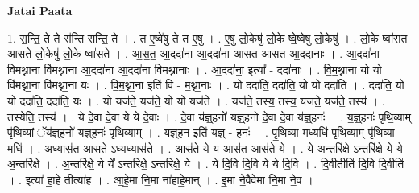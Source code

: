 \documentclass[17pt]{extarticle}
\begin{document}
\textbf{Jatai Paata} \newline

1. स॒न्ति॒ ते ते स॑न्ति सन्ति॒ ते । . त ए॒ष्वे॑षु ते त ए॒षु । . ए॒षु लो॒केषु॑ लो॒के ष्वे॒ष्वे॑षु लो॒केषु॑ । . लो॒के ष्वा॑सत आसते लो॒केषु॑ लो॒के ष्वा॑सते । . आ॒स॒त॒ आ॒ददा॑ना आ॒ददा॑ना आसत आसत आ॒ददा॑नाः । . आ॒ददा॑ना विमथ्ना॒ना वि॑मथ्ना॒ना आ॒ददा॑ना आ॒ददा॑ना विमथ्ना॒नाः । . आ॒ददा॑ना॒ इत्या᳚ - ददा॑नाः । . वि॒म॒थ्ना॒ना यो यो वि॑मथ्ना॒ना वि॑मथ्ना॒ना यः । . वि॒म॒थ्ना॒ना इति॑ वि - म॒थ्ना॒नाः । . यो ददा॑ति॒ ददा॑ति॒ यो यो ददा॑ति । . ददा॑ति॒ यो यो ददा॑ति॒ ददा॑ति॒ यः । . यो यज॑ते॒ यज॑ते॒ यो यो यज॑ते । . यज॑ते॒ तस्य॒ तस्य॒ यज॑ते॒ यज॑ते॒ तस्य॑ । . तस्येति॒ तस्य॑ । . ये दे॒वा दे॒वा ये ये दे॒वाः । . दे॒वा य॑ज्ञ्॒हनो॑ यज्ञ्॒हनो॑ दे॒वा दे॒वा य॑ज्ञ्॒हनः॑ । . य॒ज्ञ्॒हनः॑ पृथि॒व्याम् पृ॑थि॒व्यां ॅय॑ज्ञ्॒हनो॑ यज्ञ्॒हनः॑ पृथि॒व्याम् । . य॒ज्ञ्॒हन॒ इति॑ यज्ञ् - हनः॑ । . पृ॒थि॒व्या मध्यधि॑ पृथि॒व्याम् पृ॑थि॒व्या मधि॑ । . अध्यास॑त॒ आस॒ते ऽध्यध्यास॑ते । . आस॑ते॒ ये य आस॑त॒ आस॑ते॒ ये । . ये अ॒न्तरि॑क्षे॒ ऽन्तरि॑क्षे॒ ये ये अ॒न्तरि॑क्षे । . अ॒न्तरि॑क्षे॒ ये ये᳚ ऽन्तरि॑क्षे॒ ऽन्तरि॑क्षे॒ ये । . ये दि॒वि दि॒वि ये ये दि॒वि । . दि॒वीतीति॑ दि॒वि दि॒वीति॑ । . इत्या॑ हा॒हे तीत्या॑ह । . आ॒हे॒मा नि॒मा ना॑हाहे॒मान् । . इ॒मा ने॒वैवेमा नि॒मा ने॒व । \newline
\end{document}
